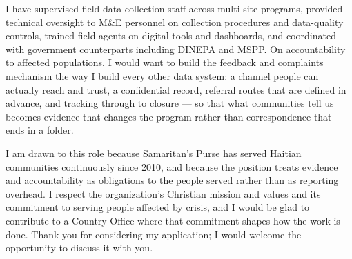 \documentclass[11pt,a4paper,sans]{moderncv}
\begin{document}
I have supervised field data-collection staff across multi-site programs, provided technical oversight to M\&E personnel on collection procedures and data-quality controls, trained field agents on digital tools and dashboards, and coordinated with government counterparts including DINEPA and MSPP. On accountability to affected populations, I would want to build the feedback and complaints mechanism the way I build every other data system: a channel people can actually reach and trust, a confidential record, referral routes that are defined in advance, and tracking through to closure --- so that what communities tell us becomes evidence that changes the program rather than correspondence that ends in a folder.

I am drawn to this role because Samaritan's Purse has served Haitian communities continuously since 2010, and because the position treats evidence and accountability as obligations to the people served rather than as reporting overhead. I respect the organization's Christian mission and values and its commitment to serving people affected by crisis, and I would be glad to contribute to a Country Office where that commitment shapes how the work is done. Thank you for considering my application; I would welcome the opportunity to discuss it with you.

\makeletterclosing
\end{document}
